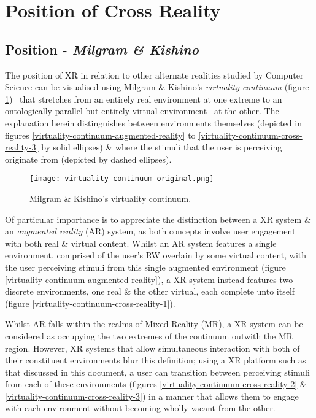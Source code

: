 \section{Position of Cross Reality}

\subsection{Position - \textit{Milgram \& Kishino}}
The position of XR in relation to other alternate realities studied by Computer Science can be visualised using Milgram \& Kishino's \textit{virtuality continuum} (figure \ref{virtuality-continuum-original})~\cite{Milgram1994} that stretches from an entirely real environment at one extreme to an ontologically parallel but entirely virtual environment~\cite{Qvortrup2002} at the other. The explanation herein distinguishes between environments themselves (depicted in figures \ref{virtuality-continuum-augmented-reality} to \ref{virtuality-continuum-cross-reality-3} by solid ellipses) \& where the stimuli that the user is perceiving originate from (depicted by dashed ellipses).



\begin{figure}[h]
	\begin{center}
		\texttt{[image: virtuality-continuum-original.png]}
		\caption{Milgram \& Kishino's virtuality continuum.}
		\label{virtuality-continuum-original}
	\end{center}
\end{figure}

Of particular importance is to appreciate the distinction between a XR system \& an \textit{augmented reality} (AR) system, as both concepts involve user engagement with both real \& virtual content. Whilst an AR system features a single environment, comprised of the user's RW overlain by some virtual content, with the user perceiving stimuli from this single augmented environment (figure \ref{virtuality-continuum-augmented-reality}), a XR system instead features two discrete environments, one real \& the other virtual, each complete unto itself (figure \ref{virtuality-continuum-cross-reality-1}).

Whilst AR falls within the realms of Mixed Reality (MR), a XR system can be considered as occupying the two extremes of the continuum outwith the MR region. However, XR systems that allow simultaneous interaction with both of their constituent environments blur this definition; using a XR platform such as that discussed in this document, a user can transition between perceiving stimuli from each of these environments (figures \ref{virtuality-continuum-cross-reality-2} \& \ref{virtuality-continuum-cross-reality-3}) in a manner that allows them to engage with each environment without becoming wholly vacant from the other.

